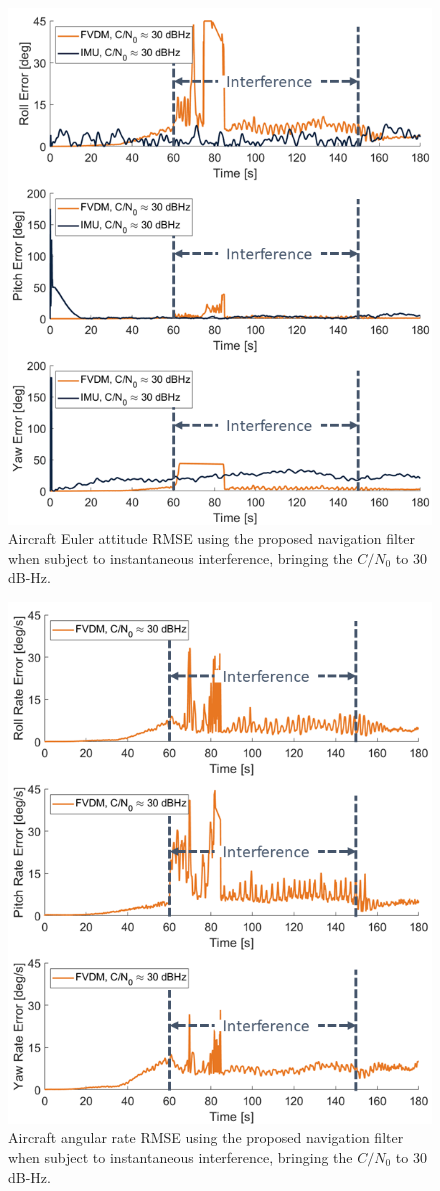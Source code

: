 \documentclass[12pt]{report}
\begin{document}
\begin{figure}[!ht]
  \centering
  \includegraphics[width=0.75\linewidth]{Figures/Results/trajectoryfigure/Slide5.PNG}
  \caption{Aircraft Euler attitude RMSE using the proposed navigation filter when subject to instantaneous interference, bringing the \(C/N_0\) to \(30\) dB-Hz.}\label{fig:Eul30}
\end{figure}


\begin{figure}[!ht]
  \centering
  \includegraphics[width=0.75\linewidth]{Figures/Results/trajectoryfigure/Slide11.PNG}
  \caption{Aircraft angular rate RMSE using the proposed navigation filter when subject to instantaneous interference, bringing the \(C/N_0\) to \(30\) dB-Hz.}\label{fig:Ang30}
\end{figure}
\end{document}
